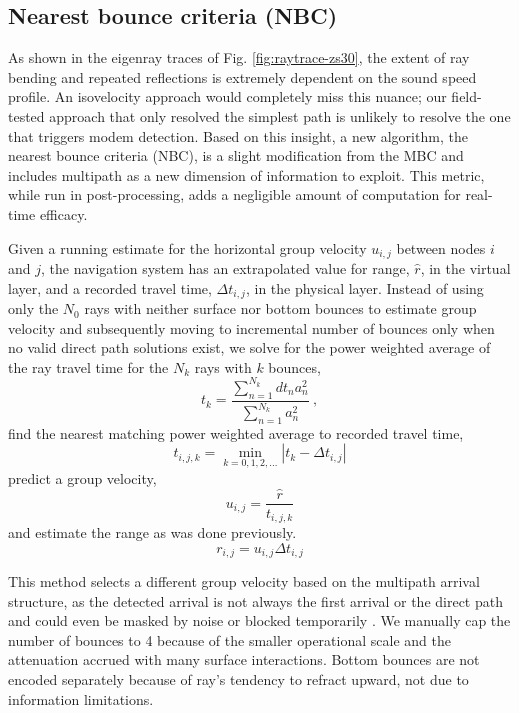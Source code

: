 \subsection{Nearest bounce criteria (NBC)}

 As shown in the eigenray traces of Fig. \ref{fig:raytrace-zs30}, the extent of ray bending and repeated reflections is extremely dependent on the sound speed profile.
An isovelocity approach would completely miss this nuance; our field-tested approach that only resolved the simplest path is unlikely to resolve the one that triggers modem detection.
Based on this insight, a new algorithm, the nearest bounce criteria (NBC), is a slight modification from the MBC and includes multipath as a new dimension of information to exploit.
This metric, while run in post-processing, adds a negligible amount of computation for real-time efficacy.

Given a running estimate for the horizontal group velocity $u_{i,j}$ between nodes $i$ and $j$, the navigation system has an extrapolated value for range, $\hat{r}$, in the virtual layer, and a recorded travel time, $\Delta t_{i,j}$, in the physical layer.
Instead of using only the $N_0$ rays with neither surface nor bottom bounces to estimate group velocity and subsequently moving to incremental number of bounces only when no valid direct path solutions exist, we solve for the power weighted average of the ray travel time for the $N_k$ rays with $k$ bounces,
\begin{equation}
t_k = \frac{\sum_{n=1}^{N_{k}} dt_{n}a_{n}^{2}}{\sum_{n=1}^{N_{k}} a_{n}^{2}} ~, 
\end{equation}
find the nearest matching power weighted average to recorded travel time,
\begin{equation}
t_{i,j,k} = \min_{k=0,1,2,...} \left| t_k - \Delta t_{i,j} \right|
\end{equation}
predict a group velocity,
\begin{equation}
u_{i,j} = \dfrac{\hat{r}}{t_{i,j,k}}
\end{equation}
and estimate the range as was done previously.
\begin{equation}
r_{i,j} = u_{i,j}\Delta t_{i,j}
\end{equation}

This method selects a different group velocity based on the multipath arrival structure, as the detected arrival is not always the first arrival or the direct path and could even be masked by noise or blocked temporarily \citep{deffenbaugh_acoustic_1996}.
We manually cap the number of bounces to 4 because of the smaller operational scale and the attenuation accrued with many surface interactions.
Bottom bounces are not encoded separately because of ray's tendency to refract upward, not due to information limitations.

